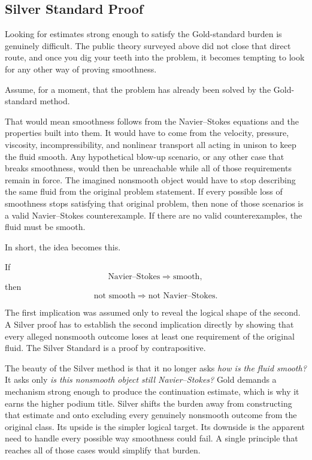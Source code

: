 \subsection{Silver Standard Proof}\label{sub:SilverStandardProof}

Looking for estimates strong enough to satisfy the Gold-standard burden is genuinely difficult.
The public theory surveyed above did not close that direct route, and once you dig your teeth into the problem, it becomes tempting to look for any other way of proving smoothness.

Assume, for a moment, that the problem has already been solved by the Gold-standard method.

That would mean smoothness follows from the Navier--Stokes equations and the properties built into them.
It would have to come from the velocity, pressure, viscosity, incompressibility, and nonlinear transport all acting in unison to keep the fluid smooth.
Any hypothetical blow-up scenario, or any other case that breaks smoothness, would then be unreachable while all of those requirements remain in force.
The imagined nonsmooth object would have to stop describing the same fluid from the original problem statement.
If every possible loss of smoothness stops satisfying that original problem, then none of those scenarios is a valid Navier--Stokes counterexample.
If there are no valid counterexamples, the fluid must be smooth.

In short, the idea becomes this.

If
\[
  \text{Navier--Stokes}
  \Longrightarrow
  \text{smooth},
\]
then
\[
  \text{not smooth}
  \Longrightarrow
  \text{not Navier--Stokes}.
\]

The first implication was assumed only to reveal the logical shape of the second.
A Silver proof has to establish the second implication directly by showing that every alleged nonsmooth outcome loses at least one requirement of the original fluid.
The Silver Standard is a proof by contrapositive.

The beauty of the Silver method is that it no longer asks \emph{how is the fluid smooth?}
It asks only \emph{is this nonsmooth object still Navier--Stokes?}
Gold demands a mechanism strong enough to produce the continuation estimate, which is why it earns the higher podium title.
Silver shifts the burden away from constructing that estimate and onto excluding every genuinely nonsmooth outcome from the original class.
Its upside is the simpler logical target.
Its downside is the apparent need to handle every possible way smoothness could fail.
A single principle that reaches all of those cases would simplify that burden.
